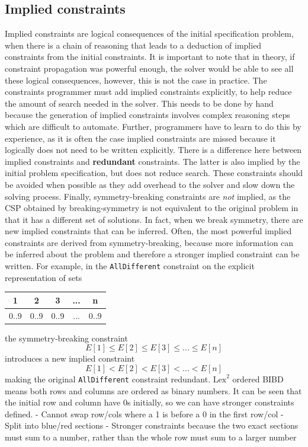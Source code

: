 \documentclass[CS4402-Notes.tex]{subfiles}
\begin{document}
\subsection{Implied constraints}
Implied constraints are logical consequences of the initial specification problem, when there is a chain of reasoning that leads to a deduction of implied constraints from the initial constraints. It is important to note that in theory, if constraint propagation was powerful enough, the solver would be able to see all these logical consequences, however, this is not the case in practice.
\n
The constraints programmer must add implied constraints explicitly, to help reduce the amount of search needed in the solver. This needs to be done by hand because the generation of implied constraints involves complex reasoning steps which are difficult to automate. Further, programmers have to learn to do this by experience, as it is often the case implied constraints are missed because it logically does not need to be written explicitly.
\n
There is a difference here between implied constraints and \textbf{redundant} constraints. The latter is also implied by the initial problem specification, but does not reduce search. These constraints should be avoided when possible as they add overhead to the solver and slow down the solving process.
\n
Finally, symmetry-breaking constraints are \textit{not} implied, as the CSP obtained by breaking-symmetry is not equivalent to the original problem in that it has a different set of solutions. In fact, when we break symmetry, there are new implied constraints that can be inferred. Often, the most powerful implied constraints are derived from symmetry-breaking, because more information can be inferred about the problem and therefore a stronger implied constraint can be written. For example, in the \texttt{AllDifferent} constraint on the explicit representation of sets
\begin{table}[H]
\centering
\begin{tabular}{| c | c | c | c | c |}
  \hline
  \textbf{1} & \textbf{2} & \textbf{3} & ... & \textbf{n} \\
  \hline
  0..9 & 0..9 & 0..9 & ... & 0..9 \\
  \hline
\end{tabular}
\end{table}
the symmetry-breaking constraint
\begin{equation*}
  E[1] \leq  E[2] \leq E[3] \leq ... \leq E[n]
\end{equation*}
introduces a new implied constraint
\begin{equation*}
E[1] < E[2] < E[3] < ... < E[n]
\end{equation*}
making the original \texttt{AllDifferent} constraint redundant.
\n
$\text{Lex}^{2}$ ordered BIBD means both rows and columns are ordered as binary numbers. It can be seen that the initial row and column have 0s initially, so we can have stronger constraints defined.
- Cannot swap row/cols where a 1 is before a 0 in the first row/col
- Split into blue/red sections
- Stronger constraints because the two exact sections must sum to a number, rather than the whole row must sum to a larger number
\end{document}
